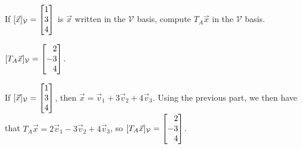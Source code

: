 \documentclass{problemset}
\begin{document}
	\begin{parts}[resume]
	\item If $[\vec x]_{\mathcal V}=\mat{1\\3\\4}$ is $\vec x$ written in the $\mathcal V$ basis,
		compute $T_A\vec x$ in the $\mathcal V$ basis.
		\begin{solution}
			$[T_A\vec x]_{\mathcal V}=\mat{2\\-3\\4}$.

			If $[\vec x]_{\mathcal V}=\mat{1\\3\\4}$, then
			$\vec x=\vec v_1+3\vec v_2+4\vec v_3$. Using the previous part, we
			then have that $T_A\vec x=2\vec v_1-3\vec v_2+4\vec v_3$, so
			$[T_A\vec x]_{\mathcal V}=\mat{2\\-3\\4}$.
		\end{solution}
	\end{parts}
\end{document}
